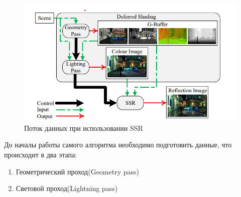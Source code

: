 \documentclass[a4paper,14pt, unknownkeysallowed]{extreport}
\begin{document}
\begin{figure}[h]
	\centering
	\includegraphics{SSR_data_flow.png}
	\caption{Поток данных при использовании SSR}
	\label{fig:SSR_data_flow}
\end{figure} 

До началы работы самого алгоритма необходимо подготовить данные, что происходит в два этапа:
\begin{enumerate}
	\item Геометрический проход(Geometry pass)
	\item Световой проход(Lightning pass)
\end{enumerate}
\end{document}
